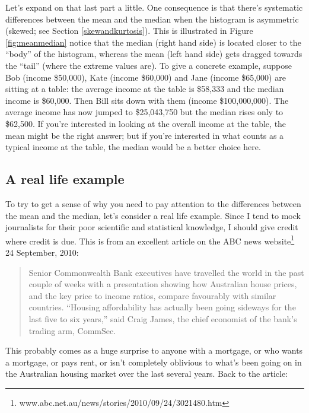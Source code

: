 \documentclass[
]{book}
\begin{document}
Let's expand on that last part a little. One consequence is that there's systematic differences between the mean and the median when the histogram is asymmetric (skewed; see Section \ref{skewandkurtosis}). This is illustrated in Figure \ref{fig:meanmedian} notice that the median (right hand side) is located closer to the ``body'' of the histogram, whereas the mean (left hand side) gets dragged towards the ``tail'' (where the extreme values are). To give a concrete example, suppose Bob (income \$50,000), Kate (income \$60,000) and Jane (income \$65,000) are sitting at a table: the average income at the table is \$58,333 and the median income is \$60,000. Then Bill sits down with them (income \$100,000,000). The average income has now jumped to \$25,043,750 but the median rises only to \$62,500. If you're interested in looking at the overall income at the table, the mean might be the right answer; but if you're interested in what counts as a typical income at the table, the median would be a better choice here.

\hypertarget{housingpriceexample}{%
\subsection{A real life example}\label{housingpriceexample}}

To try to get a sense of why you need to pay attention to the differences between the mean and the median, let's consider a real life example. Since I tend to mock journalists for their poor scientific and statistical knowledge, I should give credit where credit is due. This is from an excellent article on the ABC news website\footnote{www.abc.net.au/news/stories/2010/09/24/3021480.htm} 24 September, 2010:

\begin{quote}
Senior Commonwealth Bank executives have travelled the world in the past couple of weeks with a presentation showing how Australian house prices, and the key price to income ratios, compare favourably with similar countries. ``Housing affordability has actually been going sideways for the last five to six years,'' said Craig James, the chief economist of the bank's trading arm, CommSec.
\end{quote}

This probably comes as a huge surprise to anyone with a mortgage, or who wants a mortgage, or pays rent, or isn't completely oblivious to what's been going on in the Australian housing market over the last several years. Back to the article:
\end{document}
